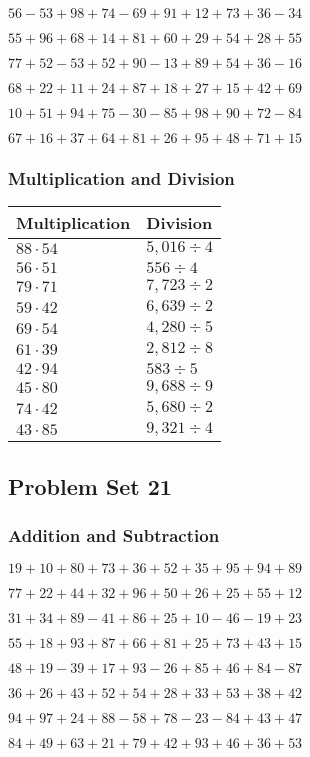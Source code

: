 \(56-53+98+74-69+91+12+73+36-34\)

\(55+96+68+14+81+60+29+54+28+55\)

\(77+52-53+52+90-13+89+54+36-16\)

\(68+22+11+24+87+18+27+15+42+69\)

\(10+51+94+75-30-85+98+90+72-84\)

\(67+16+37+64+81+26+95+48+71+15\)

\hypertarget{multiplication-and-division-60}{%
\subsubsection{Multiplication and
Division}\label{multiplication-and-division-60}}

\begin{longtable}[]{@{}ll@{}}
\toprule
Multiplication & Division\tabularnewline
\midrule
\endhead
\(88\cdot54\) & \(5,016÷4\)\tabularnewline
\(56\cdot51\) & \(556÷4\)\tabularnewline
\(79\cdot71\) & \(7,723÷2\)\tabularnewline
\(59\cdot42\) & \(6,639÷2\)\tabularnewline
\(69\cdot54\) & \(4,280÷5\)\tabularnewline
\(61\cdot39\) & \(2,812 ÷8\)\tabularnewline
\(42\cdot94\) & \(583÷5\)\tabularnewline
\(45\cdot80\) & \(9,688÷9\)\tabularnewline
\(74\cdot42\) & \(5,680÷2\)\tabularnewline
\(43\cdot85\) & \(9,321÷4\)\tabularnewline
\bottomrule
\end{longtable}

\hypertarget{problem-set-21-1}{%
\subsection{Problem Set 21}\label{problem-set-21-1}}

\hypertarget{addition-and-subtraction-61}{%
\subsubsection{Addition and
Subtraction}\label{addition-and-subtraction-61}}

\(19+10+80+73+36+52+35+95+94+ 89\)

\(77+22+44+32+96+50+26+25+55+12\)

\(31+34+89-41+86+25+10-46-19+23\)

\(55+18+93+87+66+81+25+73+43+15\)

\(48+19-39+17+93-26+85+46+84-87\)

\(36+26+43+52+54+28+33+53+38+42\)

\(94+97+24+88-58+78-23-84+43+47\)

\(84+49+63+21+79+42+93+46+36+53\)

